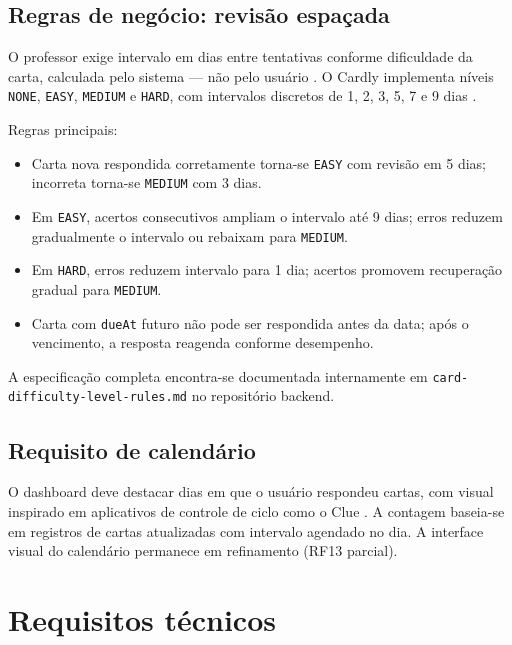 \subsection{Regras de negócio: revisão espaçada}

O professor exige intervalo em dias entre tentativas conforme dificuldade da carta, calculada pelo sistema --- não pelo usuário \cite{anki_manual,anki_sm2}. O Cardly implementa níveis \texttt{NONE}, \texttt{EASY}, \texttt{MEDIUM} e \texttt{HARD}, com intervalos discretos de 1, 2, 3, 5, 7 e 9 dias \cite{medium_spaced_repetition}.

Regras principais:
\begin{itemize}
    \item Carta nova respondida corretamente torna-se \texttt{EASY} com revisão em 5 dias; incorreta torna-se \texttt{MEDIUM} com 3 dias.
    \item Em \texttt{EASY}, acertos consecutivos ampliam o intervalo até 9 dias; erros reduzem gradualmente o intervalo ou rebaixam para \texttt{MEDIUM}.
    \item Em \texttt{HARD}, erros reduzem intervalo para 1 dia; acertos promovem recuperação gradual para \texttt{MEDIUM}.
    \item Carta com \texttt{dueAt} futuro não pode ser respondida antes da data; após o vencimento, a resposta reagenda conforme desempenho.
\end{itemize}

A especificação completa encontra-se documentada internamente em \texttt{card-difficulty-level-rules.md} no repositório backend.

\subsection{Requisito de calendário}

O dashboard deve destacar dias em que o usuário respondeu cartas, com visual inspirado em aplicativos de controle de ciclo como o Clue \cite{clue_app}. A contagem baseia-se em registros de cartas atualizadas com intervalo agendado no dia. A interface visual do calendário permanece em refinamento (RF13 parcial).

\section{Requisitos técnicos}

